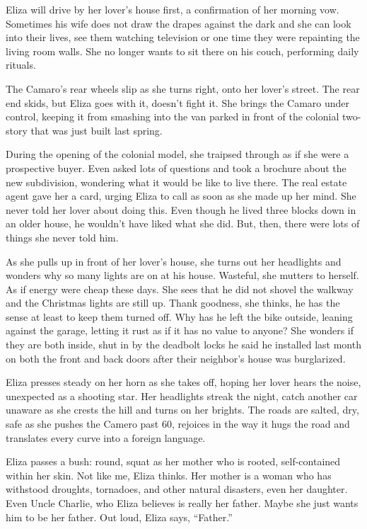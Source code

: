 \documentclass[
]{article}
\begin{document}
Eliza will drive by her lover's house first, a confirmation of her
morning vow. Sometimes his wife does not draw the drapes against the
dark and she can look into their lives, see them watching television or
one time they were repainting the living room walls. She no longer wants
to sit there on his couch, performing daily rituals.

The Camaro's rear wheels slip as she turns right, onto her lover's
street. The rear end skids, but Eliza goes with it, doesn't fight it.
She brings the Camaro under control, keeping it from smashing into the
van parked in front of the colonial two-story that was just built last
spring.

During the opening of the colonial model, she traipsed through as if she
were a prospective buyer. Even asked lots of questions and took a
brochure about the new subdivision, wondering what it would be like to
live there. The real estate agent gave her a card, urging Eliza to call
as soon as she made up her mind. She never told her lover about doing
this. Even though he lived three blocks down in an older house, he
wouldn't have liked what she did. But, then, there were lots of things
she never told him.

As she pulls up in front of her lover's house, she turns out her
headlights and wonders why so many lights are on at his house. Wasteful,
she mutters to herself. As if energy were cheap these days. She sees
that he did not shovel the walkway and the Christmas lights are still
up. Thank goodness, she thinks, he has the sense at least to keep them
turned off. Why has he left the bike outside, leaning against the
garage, letting it rust as if it has no value to anyone? She wonders if
they are both inside, shut in by the deadbolt locks he said he installed
last month on both the front and back doors after their neighbor's house
was burglarized.

Eliza presses steady on her horn as she takes off, hoping her lover
hears the noise, unexpected as a shooting star. Her headlights streak
the night, catch another car unaware as she crests the hill and turns on
her brights. The roads are salted, dry, safe as she pushes the Camero
past 60, rejoices in the way it hugs the road and translates every curve
into a foreign language.

Eliza passes a bush: round, squat as her mother who is rooted,
self-contained within her skin. Not like me, Eliza thinks. Her mother is
a woman who has withstood droughts, tornadoes, and other natural
disasters, even her daughter. Even Uncle Charlie, who Eliza believes is
really her father. Maybe she just wants him to be her father. Out loud,
Eliza says, ``Father.''
\end{document}
